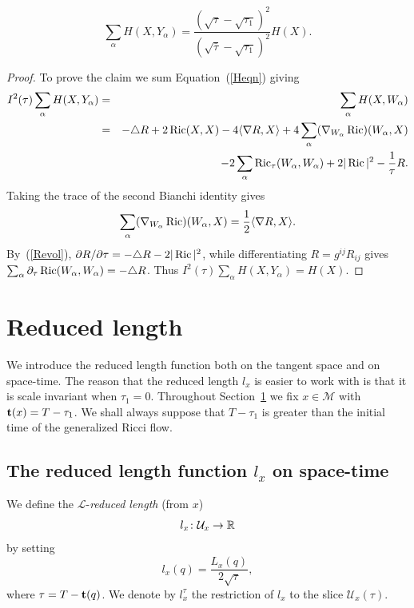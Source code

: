 \begin{claim}\label{claim:h-sum-formula}
\label{Hclaim}

$$\sum_\alpha
H(X,Y_\alpha)=\frac{(\sqrt{\tau}-\sqrt{\tau_1})^2}{(\sqrt{\bar\tau}-\sqrt{\tau_1})^2}H(X).$$
\end{claim}
\begin{proof}
\sketch
{}
To prove the claim we sum Equation~(\ref{Heqn}) giving
\begin{eqnarray*}
I^2(\tau) \sum_{\alpha}H(X,Y_{\alpha}) &= & \sum_\alpha H(X,W_\alpha)
\\
& = & -\triangle R + 2\operatorname{Ric}(X,X) - 4\langle \nabla R,X\rangle
+4\sum_{\alpha}(\nabla_{W_\alpha} \operatorname{Ric})(W_{\alpha},X) \\ & &
-2\sum_{\alpha}\operatorname{Ric}_{\tau}( W_{\alpha},W_{\alpha}) +2|\operatorname{Ric}|^{2} -\frac{1}{\tau}R.
\end{eqnarray*}
Taking the trace of the second Bianchi identity gives
$$\sum_{\alpha}(\nabla_{W_\alpha}\operatorname{Ric})(W_{\alpha},X)=\frac{1}{2}\langle\nabla R,X\rangle.$$ By~(\ref{Revol}),
$\partial R/\partial\tau=-\triangle R-2|\operatorname{Ric}|^2$, while differentiating
$R=g^{ij}R_{ij}$ gives $\sum_\alpha\partial_\tau\operatorname{Ric}(W_\alpha,W_\alpha)=-\triangle R$.
Thus $I^2(\tau)\sum_\alpha H(X,Y_\alpha)=H(X)$.
\end{proof}

\section{Reduced length}\label{sect:redln}

We introduce the reduced length function both on the tangent space
and on space-time. The reason that the reduced length $l_x$ is
easier to work with is that it is scale invariant when $\tau_1=0$.
Throughout Section~\ref{sect:redln} we fix $x\in{\mathcal M}$ with
${\bf t}(x)=T-\tau_1$. We shall always suppose that $T-\tau_1$ is
greater than the initial time of the generalized Ricci flow.

\subsection{The reduced length function $l_x$ on space-time}




\begin{definition}\label{def:reduced-length}

We define
 the $\mathcal{L}$-{\sl reduced length} (from $x$)
$$l_x\colon {\mathcal U}_x\to \mathbb{R}$$
by setting $$l_x(q)= \frac{L_x(q)}{2\sqrt{\tau}},$$ where $\tau=T-{\bf t}(q)$.
We denote by $l_x^\tau$ the restriction of $l_x$ to the slice ${\mathcal
U}_x(\tau)$.
\end{definition}


